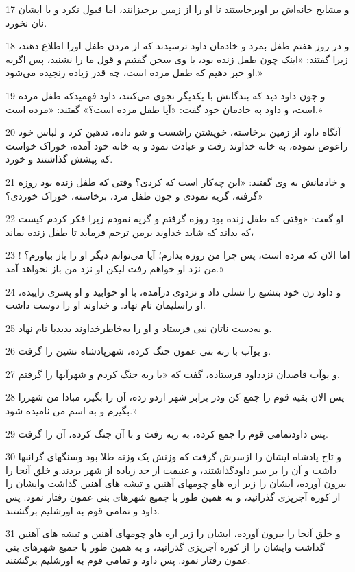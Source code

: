 \par 17 و مشایخ خانه‌اش بر اوبرخاستند تا او را از زمین برخیزانند، اما قبول نکرد و با ایشان نان نخورد.
\par 18 و در روز هفتم طفل بمرد و خادمان داود ترسیدند که از مردن طفل اورا اطلاع دهند، زیرا گفتند: «اینک چون طفل زنده بود، با وی سخن گفتیم و قول ما را نشنید، پس اگربه او خبر دهیم که طفل مرده است، چه قدر زیاده رنجیده می‌شود.»
\par 19 و چون داود دید که بندگانش با یکدیگر نجوی می‌کنند، داود فهمیدکه طفل مرده است، و داود به خادمان خود گفت: «آیا طفل مرده است؟» گفتند: «مرده است.»
\par 20 آنگاه داود از زمین برخاسته، خویشتن راشست و شو داده، تدهین کرد و لباس خود راعوض نموده، به خانه خداوند رفت و عبادت نمود و به خانه خود آمده، خوراک خواست که پیشش گذاشتند و خورد.
\par 21 و خادمانش به وی گفتند: «این چه‌کار است که کردی؟ وقتی که طفل زنده بود روزه گرفته، گریه نمودی و چون طفل مرد، برخاسته، خوراک خوردی؟»
\par 22 او گفت: «وقتی که طفل زنده بود روزه گرفتم و گریه نمودم زیرا فکر کردم کیست که بداند که شاید خداوند برمن ترحم فرماید تا طفل زنده بماند،
\par 23 اما الان که مرده است، پس چرا من روزه بدارم؛ آیا می‌توانم دیگر او را باز بیاورم؟ ! من نزد او خواهم رفت لیکن او نزد من باز نخواهد آمد.»
\par 24 و داود زن خود بتشبع را تسلی داد و نزدوی درآمده، با او خوابید و او پسری زاییده، او راسلیمان نام نهاد. و خداوند او را دوست داشت.
\par 25 و به‌دست ناتان نبی فرستاد و او را به‌خاطرخداوند یدیدیا نام نهاد.
\par 26 و یوآب با ربه بنی عمون جنگ کرده، شهرپادشاه نشین را گرفت.
\par 27 و یوآب قاصدان نزدداود فرستاده، گفت که «با ربه جنگ کردم و شهرآبها را گرفتم.
\par 28 پس الان بقیه قوم را جمع کن ودر برابر شهر اردو زده، آن را بگیر، مبادا من شهررا بگیرم و به اسم من نامیده شود.»
\par 29 پس داودتمامی قوم را جمع کرده، به ربه رفت و با آن جنگ کرده، آن را گرفت.
\par 30 و تاج پادشاه ایشان را ازسرش گرفت که وزنش یک وزنه طلا بود وسنگهای گرانبها داشت و آن را بر سر داودگذاشتند، و غنیمت از حد زیاده از شهر بردند.و خلق آنجا را بیرون آورده، ایشان را زیر اره هاو چومهای آهنین و تیشه های آهنین گذاشت وایشان را از کوره آجرپزی گذرانید، و به همین طور با جمیع شهرهای بنی عمون رفتار نمود. پس داود و تمامی قوم به اورشلیم برگشتند.
\par 31 و خلق آنجا را بیرون آورده، ایشان را زیر اره هاو چومهای آهنین و تیشه های آهنین گذاشت وایشان را از کوره آجرپزی گذرانید، و به همین طور با جمیع شهرهای بنی عمون رفتار نمود. پس داود و تمامی قوم به اورشلیم برگشتند.
 
